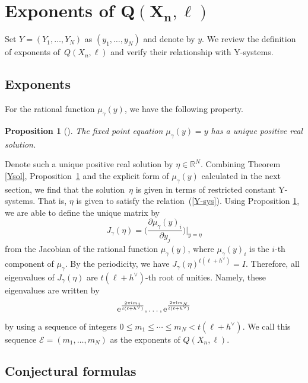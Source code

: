 \documentclass[pdftex]{sigma}
\numberwithin{equation}{section}
\newtheorem{Proposition}[Theorem]{Proposition}
\newcommand{\R}{{\mathbb R}}
\begin{document}
	\section[Exponents of Q(X\_n,ell)]{Exponents of $\boldsymbol{Q(X_n,\ell)}$}
	
Set $Y=(Y_1,\dots,Y_N)$ as $(y_1,\dots,y_N)$ and denote by $y$.
We review the definition of exponents of~$Q(X_n,\ell)$ and verify their relationship with Y-systems.
	
	\subsection{Exponents}
For the rational function $\mu_\gamma(y)$, we have the following property.
		\begin{Proposition}[{\cite{M}}]\label{eta}
		The fixed point equation $\mu_\gamma(y)=y$ has a unique positive real solution.
		\end{Proposition}
Denote such a unique positive real solution by $\eta\in\R^N$.
Combining Theorem \ref{Ysol}, Proposition~\ref{eta} and the explicit form of $\mu_\gamma(y)$ calculated in the next section, we find that the solution~$\eta$ is given in terms of restricted constant Y-systems.
That is, $\eta$ is given to satisfy the relation~(\ref{Y-sys}).
Using Proposition \ref{eta}, we are able to define the unique matrix by
		\[J_\gamma(\eta)=\biggl(\frac{\partial\mu_\gamma(y)_i}{\partial y_j}\biggr)\biggr|_{y=\eta}\]
from the Jacobian of the rational function $\mu_\gamma(y)$, where $\mu_\gamma(y)_i$ is the $i$-th component of $\mu_\gamma$.
By the periodicity, we have $J_\gamma(\eta)^{t(\ell+h^\vee)}=I$.
Therefore, all eigenvalues of $J_\gamma(\eta)$ are $t(\ell+h^\vee)$-th root of unities.
Namely, these eigenvalues are written by
\[
{\rm e}^\frac{2\pi {\rm i}m_1}{t(\ell+h^\vee)},\dots,{\rm e}^\frac{2\pi {\rm i}m_N}{t(\ell+h^\vee)}
\]
by using a sequence of integers $0\leq m_1\leq\cdots\leq m_N<t(\ell+h^\vee)$.
We call this sequence $\mathcal{E}=(m_1,\dots,m_N)$ as the exponents of $Q(X_n,\ell)$.
		
	\subsection{Conjectural formulas}
\end{document}
